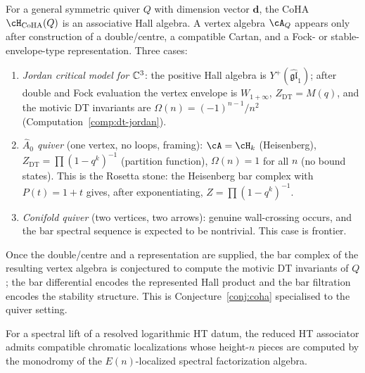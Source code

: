 \begin{remark}
\label{rem:beyond-jordan}
For a general symmetric quiver $Q$ with dimension vector $\mathbf{d}$,
the CoHA $\cH_{\mathrm{CoHA}}(Q)$ is an associative Hall algebra. A
vertex algebra $\cA_Q$ appears only after construction of a
double/centre, a compatible Cartan, and a Fock- or stable-envelope-type
representation. Three cases:
\begin{enumerate}[label=\textup{(\alph*)}]
\item \emph{Jordan critical model for $\mathbb C^3$}: the positive Hall
 algebra is $Y^+(\widehat{\mathfrak{gl}}_1)$; after double and Fock
 evaluation the vertex envelope is $W_{1+\infty}$,
 $Z_{\mathrm{DT}} = M(q)$, and the motivic DT invariants are
 $\Omega(n) = (-1)^{n-1}/n^2$
 (Computation~\ref{comp:dt-jordan}).
\item \emph{$\widehat{A}_0$ quiver} (one vertex, no loops, framing):
 $\cA = \cH_k$ (Heisenberg), $Z_{\mathrm{DT}} = \prod(1-q^k)^{-1}$
 (partition function), $\Omega(n) = 1$ for all $n$ (no bound states).
 This is the Rosetta stone: the Heisenberg bar complex with
 $P(t) = 1 + t$ gives, after exponentiating,
 $Z = \prod(1-q^k)^{-1}$.
\item \emph{Conifold quiver} (two vertices, two arrows):
 genuine wall-crossing occurs, and the bar spectral sequence is
 expected to be nontrivial. This case is frontier.
\end{enumerate}
Once the double/centre and a representation are supplied, the bar
complex of the resulting vertex algebra is conjectured to compute the
motivic DT invariants of $Q$; the bar differential encodes the
represented Hall product and the bar filtration encodes the stability
structure. This is Conjecture~\ref{conj:coha} specialised to the
quiver setting.
\end{remark}

\begin{conjecture}\label{conj:chromatic-lift}
For a spectral lift of a resolved logarithmic HT datum, the reduced HT associator admits compatible chromatic localizations whose height-$n$ pieces are computed by the monodromy of the $E(n)$-localized spectral factorization algebra.
\end{conjecture}

